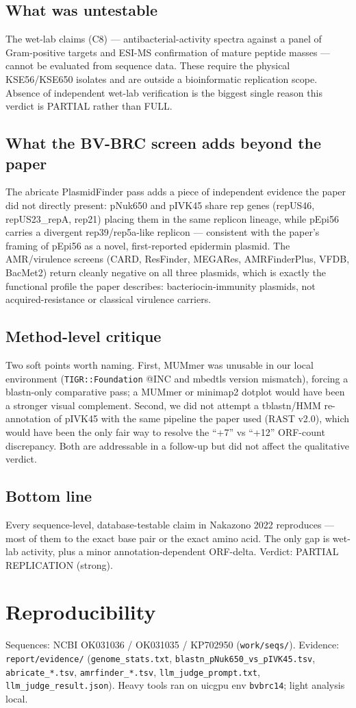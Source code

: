 \documentclass[11pt]{article}
\begin{document}
\subsection*{What was untestable}
The wet-lab claims (C8) --- antibacterial-activity spectra against a panel
of Gram-positive targets and ESI-MS confirmation of mature peptide masses
--- cannot be evaluated from sequence data. These require the physical
KSE56/KSE650 isolates and are outside a bioinformatic replication scope.
Absence of independent wet-lab verification is the biggest single reason
this verdict is PARTIAL rather than FULL.

\subsection*{What the BV-BRC screen adds beyond the paper}
The abricate PlasmidFinder pass adds a piece of independent evidence the
paper did not directly present: pNuk650 and pIVK45 share rep genes
(repUS46, repUS23\_repA, rep21) placing them in the same replicon lineage,
while pEpi56 carries a divergent rep39/rep5a-like replicon --- consistent
with the paper's framing of pEpi56 as a novel, first-reported epidermin
plasmid. The AMR/virulence screens (CARD, ResFinder, MEGARes,
AMRFinderPlus, VFDB, BacMet2) return cleanly negative on all three
plasmids, which is exactly the functional profile the paper describes:
bacteriocin-immunity plasmids, not acquired-resistance or classical
virulence carriers.

\subsection*{Method-level critique}
Two soft points worth naming. First, MUMmer was unusable in our local
environment (\texttt{TIGR::Foundation} @INC and mbedtls version mismatch),
forcing a blastn-only comparative pass; a MUMmer or minimap2 dotplot would
have been a stronger visual complement. Second, we did not attempt a
tblastn/HMM re-annotation of pIVK45 with the same pipeline the paper used
(RAST v2.0), which would have been the only fair way to resolve the ``+7''
vs ``+12'' ORF-count discrepancy. Both are addressable in a follow-up but
did not affect the qualitative verdict.

\subsection*{Bottom line}
Every sequence-level, database-testable claim in Nakazono 2022 reproduces
--- most of them to the exact base pair or the exact amino acid. The only
gap is wet-lab activity, plus a minor annotation-dependent ORF-delta.
Verdict: PARTIAL REPLICATION (strong).

\section{Reproducibility}
Sequences: NCBI OK031036 / OK031035 / KP702950 (\texttt{work/seqs/}).
Evidence: \texttt{report/evidence/} (\texttt{genome\_stats.txt},
\texttt{blastn\_pNuk650\_vs\_pIVK45.tsv}, \texttt{abricate\_*.tsv},
\texttt{amrfinder\_*.tsv}, \texttt{llm\_judge\_prompt.txt},
\texttt{llm\_judge\_result.json}).
Heavy tools ran on uicgpu env \texttt{bvbrc14}; light analysis local.
\end{document}
